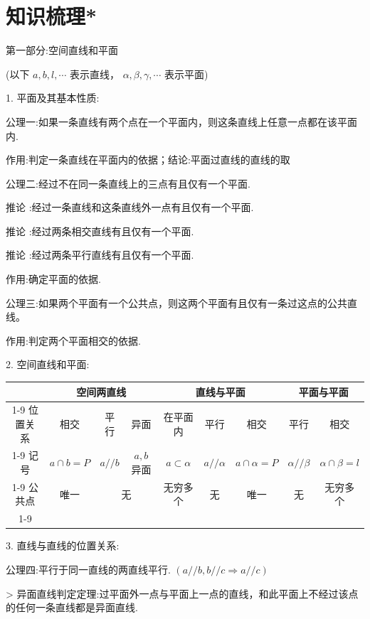 \section*{知识梳理*}

第一部分:空间直线和平面

(以下 $a,b,l,\cdots$ 表示直线， $\alpha ,\beta ,\gamma ,\cdots$ 表示平面)

1. 平面及其基本性质:

公理一:如果一条直线有两个点在一个平面内，则这条直线上任意一点都在该平面内.

作用:判定一条直线在平面内的依据；结论:平面过直线的直线的取

公理二:经过不在同一条直线上的三点有且仅有一个平面.

推论  :经过一条直线和这条直线外一点有且仅有一个平面.

推论  :经过两条相交直线有且仅有一个平面.

推论  :经过两条平行直线有且仅有一个平面.

作用:确定平面的依据.

公理三:如果两个平面有一个公共点，则这两个平面有且仅有一条过这点的公共直线。

作用:判定两个平面相交的依据.

2. 空间直线和平面:

\begin{center}
\begin{tabular}{|c|c|c|c|c|c|c|c|c|}
\hline
\phantom{X} & \multicolumn{3}{|c|}{空间两直线} & \multicolumn{3}{|c|}{直线与平面} & \multicolumn{2}{|c|}{平面与平面} \\
\cline{1-9}
位置关系 & 相交 & 平行 & 异面 & 在平面内 & 平行 & 相交 & 平行 & 相交 \\
\cline{1-9}
记号 & $a \cap  b = P$ & $a//b$ & $a,b$ 异面 & $a \subset  \alpha$ & $a//\alpha$ & $a \cap  \alpha  = P$ & $\alpha //\beta$ & $\alpha  \cap  \beta  = l$ \\
\cline{1-9}
公共点 & 唯一 & \multicolumn{2}{|c|}{无} & 无穷多个 & 无 & 唯一 & 无 & 无穷多个 \\
\cline{1-9}
\hline
\end{tabular}
\end{center}

3. 直线与直线的位置关系:

公理四:平行于同一直线的两直线平行. $\left( {a//b,b//c \Rightarrow  a//c}\right)$

> 异面直线判定定理:过平面外一点与平面上一点的直线，和此平面上不经过该点的任何一条直线都是异面直线.

